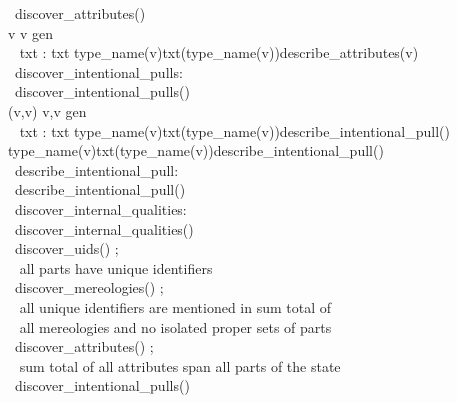\>\ discover\_attributes() {\IS} \label{discover-attributes}\\
\>\>\> {\ALL} v {\RDOT} v {\ISIN} gen \\
\>\>\>\>\  txt :{\EQ} txt {\DAGGER} {\LBRACKET}type\_name(v){\MAPSTO}txt(type\_name(v)){\CONCAT}{\LANGLE}describe\_attributes(v){\RANGLE}{\RBRACKET} \\
\>\ discover\_intentional\_pulls:  {\RIGHTARROW} \\
\>\ discover\_intentional\_pulls() {\IS} \label{discover-intentional-pulls}\\
\>\>\> {\ALL} (v{\PRIM},v{\PRIM}{\PRIM}) {\RDOT} {\LBRACE}v{\PRIM},v{\PRIM}{\PRIM}{\RBRACE} {\SUBSETEQ} gen\\
\>\>\>\>\  txt :{\EQ} txt {\DAGGER} {\LBRACKET}type\_name(v{\PRIM}){\MAPSTO}txt(type\_name(v{\PRIM})){\CONCAT}{\LANGLE}describe\_intentional\_pull(){\RANGLE}{\RBRACKET}\\
\>\>\>\>\>\>\>\>{\DAGGER} {\LBRACKET}type\_name(v{\PRIM}{\PRIM}){\MAPSTO}txt(type\_name(v{\PRIM}{\PRIM})){\CONCAT}{\LANGLE}describe\_intentional\_pull(){\RANGLE}{\RBRACKET} \\
\>\ describe\_intentional\_pull:  {\RIGHTARROW} {\DOTDOTDOT}\\
\>\ describe\_intentional\_pull() {\IS} {\DOTDOTDOT}
\ep
\pos{}{\endboiteepaisseavecuntitre\pos{\normalsize}{\HHHH}\rm}
\pos{\psno}{\mnewfoil}\label{discoveryII}
\LLLL
\bp
{}\\
\>\ discover\_internal\_qualities:  {\RIGHTARROW} \\
\>\ discover\_internal\_qualities() {\IS} \\
\>\>\>\ discover\_uids() ;\\
\>\>\>\>\>\  {\LBRACKET} all parts have unique identifiers {\RBRACKET}\\
\>\>\>\ discover\_mereologies() ;\\
\>\>\>\>\>\  {\LBRACKET} all unique identifiers are mentioned in sum total of {\RBRACKET}\\
\>\>\>\>\>\>\>\ {\LBRACKET} all mereologies and no isolated proper sets of parts {\RBRACKET}\\
\>\>\>\ discover\_attributes() ; \\
\>\>\>\>\>\  {\LBRACKET} sum total of all attributes span all parts of the state {\RBRACKET}\\
\>\>\>\ discover\_intentional\_pulls()
\ep
\noindent
\endboiteepaisseavecuntitre\pos{\normalsize}{\HHHH}\rm

